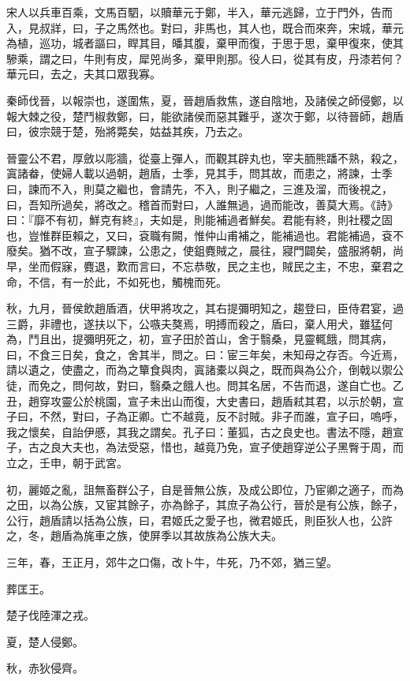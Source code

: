\begin{pinyinscope}
宋人以兵車百乘，文馬百駟，以贖華元于鄭，半入，華元逃歸，立于門外，告而入，見叔牂，曰，子之馬然也。對曰，非馬也，其人也，既合而來奔，宋城，華元為植，巡功，城者謳曰，睅其目，皤其腹，棄甲而復，于思于思，棄甲復來，使其驂乘，謂之曰，牛則有皮，犀兕尚多，棄甲則那。役人曰，從其有皮，丹漆若何？華元曰，去之，夫其口眾我寡。

秦師伐晉，以報崇也，遂圍焦，夏，晉趙盾救焦，遂自陰地，及諸侯之師侵鄭，以報大棘之役，楚鬥椒救鄭，曰，能欲諸侯而惡其難乎，遂次于鄭，以待晉師，趙盾曰，彼宗競于楚，殆將斃矣，姑益其疾，乃去之。

晉靈公不君，厚斂以彫牆，從臺上彈人，而觀其辟丸也，宰夫胹熊蹯不熟，殺之，寘諸畚，使婦人載以過朝，趙盾，士季，見其手，問其故，而患之，將諫，士季曰，諫而不入，則莫之繼也，會請先，不入，則子繼之，三進及溜，而後視之，曰，吾知所過矣，將改之。稽首而對曰，人誰無過，過而能改，善莫大焉。《詩》曰：『靡不有初，鮮克有終』，夫如是，則能補過者鮮矣。君能有終，則社稷之固也，豈惟群臣賴之，又曰，袞職有闕，惟仲山甫補之，能補過也。君能補過，袞不廢矣。猶不改，宣子驟諫，公患之，使鉏麑賊之，晨往，寢門闢矣，盛服將朝，尚早，坐而假寐，麑退，歎而言曰，不忘恭敬，民之主也，賊民之主，不忠，棄君之命，不信，有一於此，不如死也，觸槐而死。

秋，九月，晉侯飲趙盾酒，伏甲將攻之，其右提彌明知之，趨登曰，臣侍君宴，過三爵，非禮也，遂扶以下，公嗾夫獒焉，明搏而殺之，盾曰，棄人用犬，雖猛何為，鬥且出，提彌明死之，初，宣子田於首山，舍于翳桑，見靈輒餓，問其病，曰，不食三日矣，食之，舍其半，問之。曰：宦三年矣，未知母之存否。今近焉，請以遺之，使盡之，而為之簞食與肉，寘諸橐以與之，既而與為公介，倒戟以禦公徒，而免之，問何故，對曰，翳桑之餓人也。問其名居，不告而退，遂自亡也。乙丑，趙穿攻靈公於桃園，宣子未出山而復，大史書曰，趙盾弒其君，以示於朝，宣子曰，不然，對曰，子為正卿。亡不越竟，反不討賊。非子而誰，宣子曰，嗚呼，我之懷矣，自詒伊慼，其我之謂矣。孔子曰：董狐，古之良史也。書法不隱，趙宣子，古之良大夫也，為法受惡，惜也，越竟乃免，宣子使趙穿逆公子黑臀于周，而立之，壬申，朝于武宮。

初，麗姬之亂，詛無畜群公子，自是晉無公族，及成公即位，乃宦卿之適子，而為之田，以為公族，又宦其餘子，亦為餘子，其庶子為公行，晉於是有公族，餘子，公行，趙盾請以括為公族，曰，君姬氏之愛子也，微君姬氏，則臣狄人也，公許之，冬，趙盾為旄車之族，使屏季以其故族為公族大夫。

三年，春，王正月，郊牛之口傷，改卜牛，牛死，乃不郊，猶三望。

葬匡王。

楚子伐陸渾之戎。

夏，楚人侵鄭。

秋，赤狄侵齊。


\end{pinyinscope}
